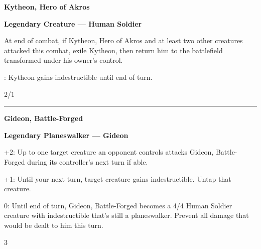 \documentclass[8pt]{extarticle}
\begin{document}
{\large\textbf{Kytheon, Hero of Akros}}
\hfill
\W

\textbf{Legendary Creature — Human Soldier}

At end of combat, if Kytheon, Hero of Akros and at least two other creatures attacked this combat, exile Kytheon, then return him to the battlefield transformed under his owner's control.

\2\W: Kytheon gains indestructible until end of turn.

\hfill2/1

\vfill
\hrule
\vfill

{\large\textbf{Gideon, Battle-Forged}}

\textbf{Legendary Planeswalker — Gideon}

+2: Up to one target creature an opponent controls attacks Gideon, Battle-Forged during its controller's next turn if able.

+1: Until your next turn, target creature gains indestructible. Untap that creature.

0: Until end of turn, Gideon, Battle-Forged becomes a 4/4 Human Soldier creature with indestructible that's still a planeswalker. Prevent all damage that would be dealt to him this turn.

\hfill3
\end{document}

